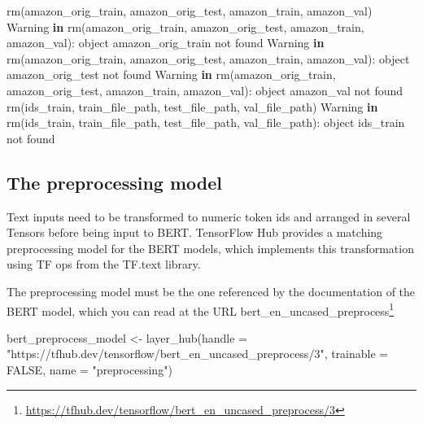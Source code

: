\documentclass[
]{article}
\newenvironment{Shaded}{}{}
\newcommand{\AttributeTok}[1]{\textcolor[rgb]{0.49,0.56,0.16}{#1}}
\newcommand{\ConstantTok}[1]{\textcolor[rgb]{0.53,0.00,0.00}{#1}}
\newcommand{\ControlFlowTok}[1]{\textcolor[rgb]{0.00,0.44,0.13}{\textbf{#1}}}
\newcommand{\FunctionTok}[1]{\textcolor[rgb]{0.02,0.16,0.49}{#1}}
\newcommand{\NormalTok}[1]{#1}
\newcommand{\OtherTok}[1]{\textcolor[rgb]{0.00,0.44,0.13}{#1}}
\newcommand{\SpecialCharTok}[1]{\textcolor[rgb]{0.25,0.44,0.63}{#1}}
\newcommand{\StringTok}[1]{\textcolor[rgb]{0.25,0.44,0.63}{#1}}
\DeclareRobustCommand{\href}[2]{#2\footnote{\url{#1}}}
\begin{document}
\begin{Shaded}
\begin{Highlighting}[]
\FunctionTok{rm}\NormalTok{(amazon\_orig\_train, amazon\_orig\_test, amazon\_train, amazon\_val)}
\NormalTok{Warning }\ControlFlowTok{in} \FunctionTok{rm}\NormalTok{(amazon\_orig\_train, amazon\_orig\_test, amazon\_train, amazon\_val)}\SpecialCharTok{:}
\NormalTok{object }\StringTok{\textquotesingle{}amazon\_orig\_train\textquotesingle{}}\NormalTok{ not found}
\NormalTok{Warning }\ControlFlowTok{in} \FunctionTok{rm}\NormalTok{(amazon\_orig\_train, amazon\_orig\_test, amazon\_train, amazon\_val)}\SpecialCharTok{:}
\NormalTok{object }\StringTok{\textquotesingle{}amazon\_orig\_test\textquotesingle{}}\NormalTok{ not found}
\NormalTok{Warning }\ControlFlowTok{in} \FunctionTok{rm}\NormalTok{(amazon\_orig\_train, amazon\_orig\_test, amazon\_train, amazon\_val)}\SpecialCharTok{:}
\NormalTok{object }\StringTok{\textquotesingle{}amazon\_val\textquotesingle{}}\NormalTok{ not found}
\FunctionTok{rm}\NormalTok{(ids\_train, train\_file\_path, test\_file\_path, val\_file\_path)}
\NormalTok{Warning }\ControlFlowTok{in} \FunctionTok{rm}\NormalTok{(ids\_train, train\_file\_path, test\_file\_path, val\_file\_path)}\SpecialCharTok{:}\NormalTok{ object}
\StringTok{\textquotesingle{}ids\_train\textquotesingle{}}\NormalTok{ not found}
\end{Highlighting}
\end{Shaded}

\newpage

\hypertarget{the-preprocessing-model}{%
\subsection{The preprocessing model}\label{the-preprocessing-model}}

Text inputs need to be transformed to numeric token ids and arranged in
several Tensors before being input to BERT. TensorFlow Hub provides a
matching preprocessing model for the BERT models, which implements this
transformation using TF ops from the TF.text library.

The preprocessing model must be the one referenced by the documentation
of the BERT model, which you can read at the URL
\href{https://tfhub.dev/tensorflow/bert_en_uncased_preprocess/3}{bert\_en\_uncased\_preprocess}

\begin{Shaded}
\begin{Highlighting}[]
\NormalTok{bert\_preprocess\_model }\OtherTok{\textless{}{-}} \FunctionTok{layer\_hub}\NormalTok{(}\AttributeTok{handle =} \StringTok{"https://tfhub.dev/tensorflow/bert\_en\_uncased\_preprocess/3"}\NormalTok{,}
    \AttributeTok{trainable =} \ConstantTok{FALSE}\NormalTok{, }\AttributeTok{name =} \StringTok{"preprocessing"}\NormalTok{)}
\end{Highlighting}
\end{Shaded}
\end{document}
